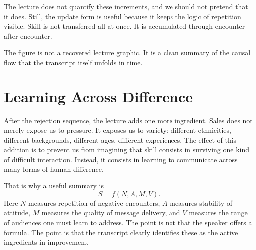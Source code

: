 The lecture does not quantify these increments, and we should not pretend that it does. Still, the update form is useful because it keeps the logic of repetition visible. Skill is not transferred all at once. It is accumulated through encounter after encounter.

\begin{figure}[h]
\centering
{}
\end{figure}

The figure is not a recovered lecture graphic. It is a clean summary of the causal flow that the transcript itself unfolds in time.

\section{Learning Across Difference}

After the rejection sequence, the lecture adds one more ingredient. Sales does not merely expose us to pressure. It exposes us to variety: different ethnicities, different backgrounds, different ages, different experiences. The effect of this addition is to prevent us from imagining that skill consists in surviving one kind of difficult interaction. Instead, it consists in learning to communicate across many forms of human difference.

That is why a useful summary is
\begin{equation}
S = f(N, A, M, V).
\end{equation}
Here \(N\) measures repetition of negative encounters, \(A\) measures stability of attitude, \(M\) measures the quality of message delivery, and \(V\) measures the range of audiences one must learn to address. The point is not that the speaker offers a formula. The point is that the transcript clearly identifies these as the active ingredients in improvement.

